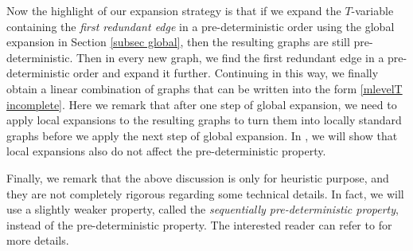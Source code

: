 \documentclass{article}
\newcommand{\1}{\mathds{1}}
\numberwithin{equation}{section}
\theoremstyle{plain} %
\theoremstyle{remark}
\begin{document}
Now the highlight of our expansion strategy is that if we expand the $T$-variable containing the \emph{first redundant edge} in a pre-deterministic order using the global expansion in Section \ref{subsec global}, then the resulting graphs are still pre-deterministic. Then in every new graph, we find the first redundant edge in a pre-deterministic order and expand it further. Continuing in this way, we  finally obtain a linear combination of graphs that can be written into the form \eqref{mlevelT incomplete}. Here we remark that %
after one step of global expansion, we need to apply local expansions to the resulting graphs to turn them into locally standard graphs before we apply the next step of global expansion. In \cite{PartII_high}, we will show that local expansions also do not affect the pre-deterministic property. 


Finally, we remark that the above discussion is only for heuristic purpose, and they are not completely rigorous regarding some technical details. In fact, we will use a slightly weaker property, called the \emph{sequentially pre-deterministic property}, instead of the pre-deterministic property. The interested reader can refer to \cite{PartII_high} for more details. 
\end{document}
